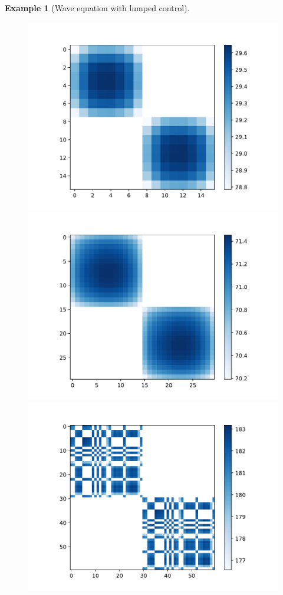 \documentclass[11pt, a4paper, reqno]{amsart}
\theoremstyle{plain}
\numberwithin{equation}{section}
\newtheorem{example}{Example}[section]
\begin{document}
\begin{example}[Wave equation with lumped control]
\begin{figure}
	\includegraphics[scale=0.35]{figures/wave_mat-8d}
	\hspace{0.1cm}
	\includegraphics[scale=0.35]{figures/wave_mat-15d}
	\hspace{0.1cm}
	\includegraphics[scale=0.35]{figures/wave_mat-30d}

\end{figure}
\end{example}
\end{document}
